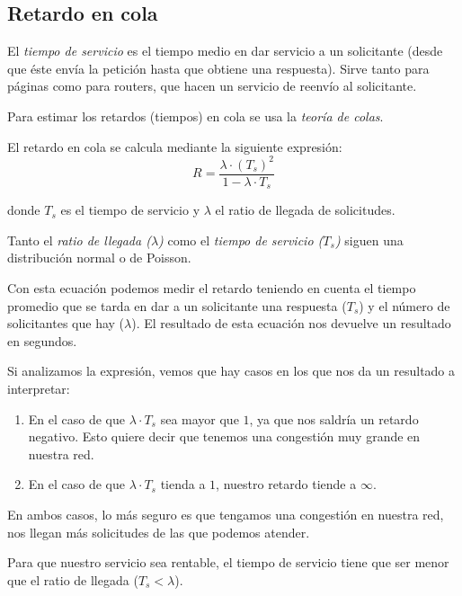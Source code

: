\documentclass[10pt,a4paper,spanish]{report}
\begin{document}
\subsection{\textcolor{tema2}Retardo en cola}
El \textit{\textcolor{tema2}{tiempo de servicio}} es el tiempo medio en dar servicio a un solicitante (desde que éste envía la petición hasta que obtiene una respuesta). Sirve tanto para páginas como para routers, que hacen un servicio de reenvío al solicitante.

Para estimar los retardos (tiempos) en cola se usa la \textit{\textcolor{tema2}{teoría de colas}}. %



El retardo en cola se calcula mediante la siguiente expresión:
\begin{displaymath}
R = \frac{\lambda \cdot (T_s)^2}{1 - \lambda \cdot T_s}
\end{displaymath}

donde $T_s$ es el tiempo de servicio y $\lambda$ el ratio de llegada de solicitudes.

Tanto el \textit{\textcolor{tema2}{ratio de llegada ($\lambda$)}} como el \textit{\textcolor{tema2}{tiempo de servicio ($T_s$)}} siguen una distribución normal o de Poisson.

Con esta ecuación podemos medir el retardo teniendo en cuenta el tiempo promedio que se tarda en dar a un solicitante una respuesta ($T_s$) y el número de solicitantes que hay ($\lambda$). El resultado de esta ecuación nos devuelve un resultado en segundos.

Si analizamos la expresión, vemos que hay casos en los que nos da un resultado a interpretar:
\begin{enumerate}[\color{tema2}{$\heartsuit$}]
  \item En el caso de que $\lambda \cdot T_s$ sea mayor que $1$, ya que nos saldría un retardo negativo. Esto quiere decir que tenemos una congestión muy grande en nuestra red.
  \item En el caso de que $\lambda \cdot T_s$ tienda a $1$, nuestro retardo tiende a $\infty$.
\end{enumerate}

En ambos casos, lo más seguro es que tengamos una congestión en nuestra red, nos llegan más solicitudes de las que podemos atender.

Para que nuestro servicio sea rentable, el tiempo de servicio tiene que ser menor que el ratio de llegada ($T_s < \lambda$).
\end{document}
